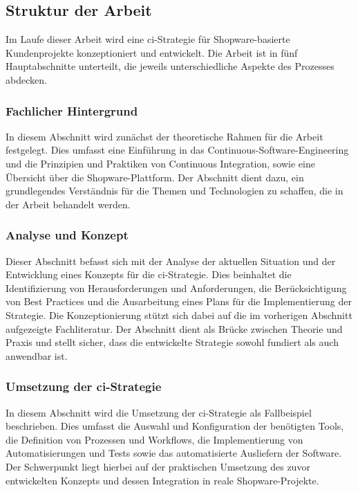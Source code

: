 \subsection{Struktur der Arbeit} \label{subsec:01-introduction-3}

Im Laufe dieser Arbeit wird eine \acrshort{ci}-Strategie für Shopware-basierte Kundenprojekte konzeptioniert und
entwickelt.
Die Arbeit ist in fünf Hauptabschnitte unterteilt, die jeweils unterschiedliche Aspekte des Prozesses abdecken.

\subsubsection{Fachlicher Hintergrund}

In diesem Abschnitt wird zunächst der theoretische Rahmen für die Arbeit festgelegt.
Dies umfasst eine Einführung in das Continuous-Software-Engineering und die Prinzipien und Praktiken von
Continuous Integration, sowie eine Übersicht über die Shopware-Plattform.
Der Abschnitt dient dazu, ein grundlegendes Verständnis für die Themen und Technologien zu schaffen, die in
der Arbeit behandelt werden.

\subsubsection{Analyse und Konzept}

Dieser Abschnitt befasst sich mit der Analyse der aktuellen Situation und der Entwicklung eines Konzepts für die
\acrshort{ci}-Strategie.
Dies beinhaltet die Identifizierung von Herausforderungen und Anforderungen, die Berücksichtigung von Best
Practices und die Ausarbeitung eines Plans für die Implementierung der Strategie.
Die Konzeptionierung stützt sich dabei auf die im vorherigen Abschnitt aufgezeigte Fachliteratur.
Der Abschnitt dient als Brücke zwischen Theorie und Praxis und stellt sicher, dass die entwickelte Strategie sowohl
fundiert als auch anwendbar ist.

\subsubsection{Umsetzung der \acrshort{ci}-Strategie}

In diesem Abschnitt wird die Umsetzung der \acrshort{ci}-Strategie als Fallbeispiel beschrieben.
Dies umfasst die Auswahl und Konfiguration der benötigten Tools, die Definition von Prozessen und Workflows,
die Implementierung von Automatisierungen und Tests sowie das automatisierte Ausliefern der Software.
Der Schwerpunkt liegt hierbei auf der praktischen Umsetzung des zuvor entwickelten Konzepts und dessen Integration in
reale Shopware-Projekte.

